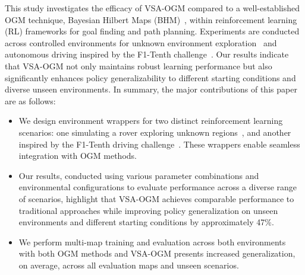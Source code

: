 This study investigates the efficacy of VSA-OGM compared to a well-established OGM technique, Bayesian Hilbert Maps (BHM)~\cite{senanayake2017bayesian}, within reinforcement learning (RL) frameworks for goal finding and path planning. Experiments are conducted across controlled environments for unknown environment exploration~\cite{Koutras2021MarsExplorer} and autonomous driving inspired by the F1-Tenth challenge~\cite{Brunnbauer_racecar_gym}. Our results indicate that VSA-OGM not only maintains robust learning performance but also significantly enhances policy generalizability to different starting conditions and diverse unseen environments.
In summary, the major contributions of this paper are as follows:
\begin{itemize}
    \item We design environment wrappers for two distinct reinforcement learning scenarios: one simulating a rover exploring unknown regions~\cite{Koutras2021MarsExplorer}, and another inspired by the F1-Tenth driving challenge~\cite{Brunnbauer_racecar_gym}. These wrappers enable seamless integration with OGM methods.
    \item Our results, conducted using various parameter combinations and environmental configurations to evaluate performance across a diverse range of scenarios, highlight that VSA-OGM achieves comparable performance to traditional approaches while improving policy generalization on unseen environments and different starting conditions by approximately 47\%.
    \item We perform multi-map training and evaluation across both environments with both OGM methods and VSA-OGM presents increased generalization, on average, across all evaluation maps and unseen scenarios.
\end{itemize}